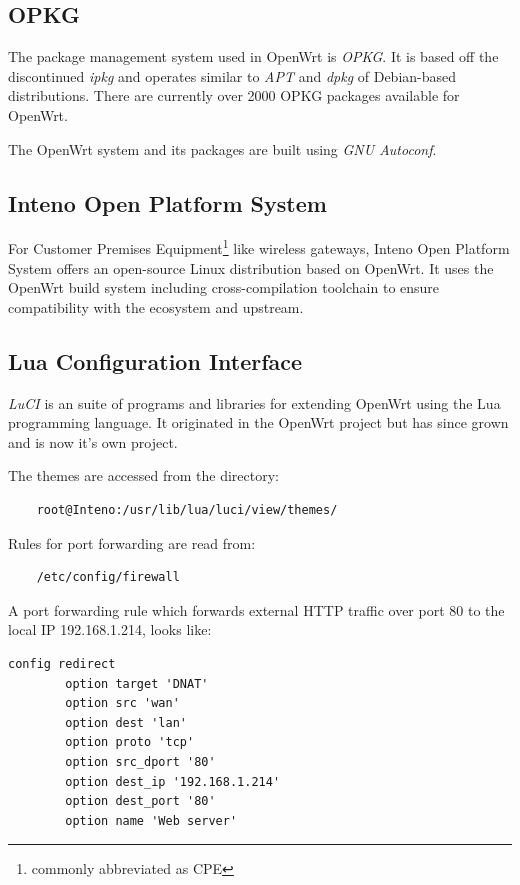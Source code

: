 \documentclass[a4paper,11pt]{kth-mag}
\begin{document}
\subsection{OPKG}
The package management system used in OpenWrt is \emph{OPKG}. It is based off the discontinued \emph{ipkg} and operates similar to \emph{APT} and \emph{dpkg} of Debian-based distributions.
There are currently over 2000 OPKG packages available for OpenWrt.

The OpenWrt system and its packages are built using \emph{GNU Autoconf}.

\subsection{Inteno Open Platform System}
For Customer Premises Equipment\footnote{commonly abbreviated as CPE} like wireless gateways, Inteno Open Platform System offers an open-source Linux distribution based on OpenWrt.
It uses the OpenWrt build system including cross-compilation toolchain to ensure compatibility with the ecosystem and upstream.

\subsection{Lua Configuration Interface}
\emph{LuCI} is an suite of programs and libraries for extending OpenWrt using the Lua programming language.
It originated in the OpenWrt project but has since grown and is now it's own project.

The themes are accessed from the directory:

\begin{verbatim}
    root@Inteno:/usr/lib/lua/luci/view/themes/
\end{verbatim}

Rules for port forwarding are read from:

\begin{verbatim}
    /etc/config/firewall
\end{verbatim}

A port forwarding rule which forwards external HTTP traffic over port 80 to the local IP 192.168.1.214, looks like:

\begin{verbatim}
config redirect               
        option target 'DNAT' 
        option src 'wan'
        option dest 'lan'
        option proto 'tcp'
        option src_dport '80'
        option dest_ip '192.168.1.214'
        option dest_port '80' 
        option name 'Web server'
\end{verbatim}
\end{document}
